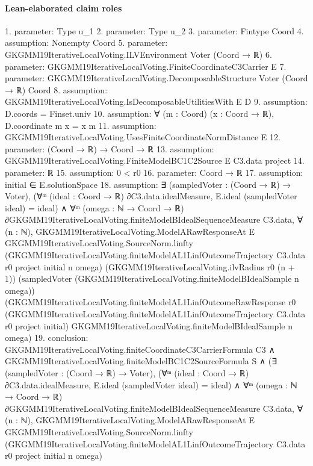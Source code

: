 \documentclass[10pt]{article}
\begin{document}
\paragraph{Lean-elaborated claim roles}\begin{ReviewVerbatim}
1. parameter: Type u_1
2. parameter: Type u_2
3. parameter: Fintype Coord
4. assumption: Nonempty Coord
5. parameter: GKGMM19IterativeLocalVoting.ILVEnvironment Voter (Coord → ℝ)
6. parameter: GKGMM19IterativeLocalVoting.FiniteCoordinateC3Carrier E
7. parameter: GKGMM19IterativeLocalVoting.DecomposableStructure Voter (Coord → ℝ) Coord
8. assumption: GKGMM19IterativeLocalVoting.IsDecomposableUtilitiesWith E D
9. assumption: D.coords = Finset.univ
10. assumption: ∀ (m : Coord) (x : Coord → ℝ), D.coordinate m x = x m
11. assumption: GKGMM19IterativeLocalVoting.UsesFiniteCoordinateNormDistance E
12. parameter: (Coord → ℝ) → Coord → ℝ
13. assumption: GKGMM19IterativeLocalVoting.FiniteModelBC1C2Source E C3.data project
14. parameter: ℝ
15. assumption: 0 < r0
16. parameter: Coord → ℝ
17. assumption: initial ∈ E.solutionSpace
18. assumption: ∃ (sampledVoter : (Coord → ℝ) → Voter),
  (∀ᵐ (ideal : Coord → ℝ) ∂C3.data.idealMeasure, E.ideal (sampledVoter ideal) = ideal) ∧
    ∀ᵐ (omega : ℕ → Coord → ℝ) ∂GKGMM19IterativeLocalVoting.finiteModelBIdealSequenceMeasure C3.data,
      ∀ (n : ℕ),
        GKGMM19IterativeLocalVoting.ModelARawResponseAt E GKGMM19IterativeLocalVoting.SourceNorm.linfty
          (GKGMM19IterativeLocalVoting.finiteModelAL1LinfOutcomeTrajectory C3.data r0 project initial n omega)
          (GKGMM19IterativeLocalVoting.ilvRadius r0 (n + 1))
          (sampledVoter (GKGMM19IterativeLocalVoting.finiteModelBIdealSample n omega))
          (GKGMM19IterativeLocalVoting.finiteModelAL1LinfOutcomeRawResponse r0
            (GKGMM19IterativeLocalVoting.finiteModelAL1LinfOutcomeTrajectory C3.data r0 project initial)
            GKGMM19IterativeLocalVoting.finiteModelBIdealSample n omega)
19. conclusion: GKGMM19IterativeLocalVoting.finiteCoordinateC3CarrierFormula C3 ∧
  GKGMM19IterativeLocalVoting.finiteModelBC1C2SourceFormula S ∧
    (∃ (sampledVoter : (Coord → ℝ) → Voter),
        (∀ᵐ (ideal : Coord → ℝ) ∂C3.data.idealMeasure, E.ideal (sampledVoter ideal) = ideal) ∧
          ∀ᵐ (omega : ℕ → Coord → ℝ) ∂GKGMM19IterativeLocalVoting.finiteModelBIdealSequenceMeasure C3.data,
            ∀ (n : ℕ),
              GKGMM19IterativeLocalVoting.ModelARawResponseAt E GKGMM19IterativeLocalVoting.SourceNorm.linfty
                (GKGMM19IterativeLocalVoting.finiteModelAL1LinfOutcomeTrajectory C3.data r0 project initial n omega)

\end{ReviewVerbatim}
\end{document}
